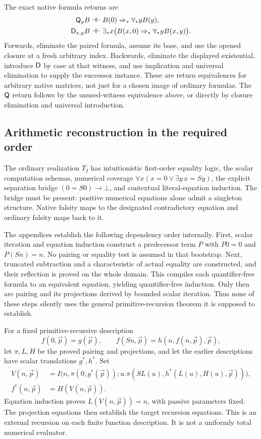 The exact native formula returns are
\begin{align*}
 \mathsf Q_yB&\dashv\vdash B(0)\Rightarrow_*\forall_*yB(y),\\
 \mathsf D_{x,y}B&\dashv\vdash
  \exists_*x\bigl(B(x,0)\Rightarrow_*\forall_*yB(x,y)\bigr).
\end{align*}
Forwards, eliminate the paired formula, assume its base, and use the
opened closure at a fresh arbitrary index. Backwards, eliminate the
displayed existential, introduce $\mathsf D$ by case at that witness, and use
implication and universal elimination to supply the successor instance.
These are return equivalences for arbitrary native matrices, not just
for a chosen image of ordinary formulas.
The $\mathsf Q$ return follows by the unused-witness equivalence above, or
directly by closure elimination and universal introduction.

\subsection{Arithmetic reconstruction in the required order}

The ordinary realization $T_I$ has intuitionistic first-order equality
logic, the scalar computation schemas, numerical coverage
$\forall x(x=0\lor\exists y\,x=Sy)$, the explicit separation bridge
$(0=S0)\to\bot$, and contextual literal-equation induction.
The bridge must be present: positive numerical equations alone admit
a singleton structure. Native falsity maps to the designated contradictory
equation and ordinary falsity maps back to it.

The appendices establish the following dependency order internally.
First, scalar iteration and equation induction construct a predecessor
term $P$ with $P0=0$ and $P(Sn)=n$. No pairing or equality test is assumed
in that bootstrap. Next, truncated subtraction and a characteristic of
actual equality are constructed, and their reflection is proved on the
whole domain. This compiles each quantifier-free formula to an equivalent
equation, yielding quantifier-free induction. Only then are pairing and
its projections derived by bounded scalar iteration. Thus none of these
steps silently uses the general primitive-recursion theorem it is
supposed to establish.

For a fixed primitive-recursive description
\[
 f(0,\vec p)=g(\vec p),\qquad
 f(Sn,\vec p)=h(n,f(n,\vec p),\vec p),
\]
let $\pi,L,H$ be the proved pairing and projections, and let the earlier
descriptions have scalar translations $g^*,h^*$. Set
\begin{align*}
 V(n,\vec p)&=I\bigl(n,\pi(0,g^*(\vec p));
  u.\pi(SL(u),h^*(L(u),H(u),\vec p))\bigr),\\
 f^*(n,\vec p)&=H(V(n,\vec p)).
\end{align*}
Equation induction proves $L(V(n,\vec p))=n$, with passive parameters
fixed. The projection equations then establish the target recursion
equations. This is an external recursion on each finite function
description. It is not a uniformly total numerical evaluator.

